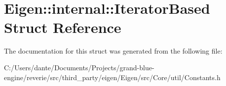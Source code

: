 \hypertarget{struct_eigen_1_1internal_1_1_iterator_based}{}\section{Eigen\+::internal\+::Iterator\+Based Struct Reference}
\label{struct_eigen_1_1internal_1_1_iterator_based}


The documentation for this struct was generated from the following file\+:\begin{DoxyCompactItemize}
\item 
C\+:/\+Users/dante/\+Documents/\+Projects/grand-\/blue-\/engine/reverie/src/third\+\_\+party/eigen/\+Eigen/src/\+Core/util/Constants.\+h\end{DoxyCompactItemize}

